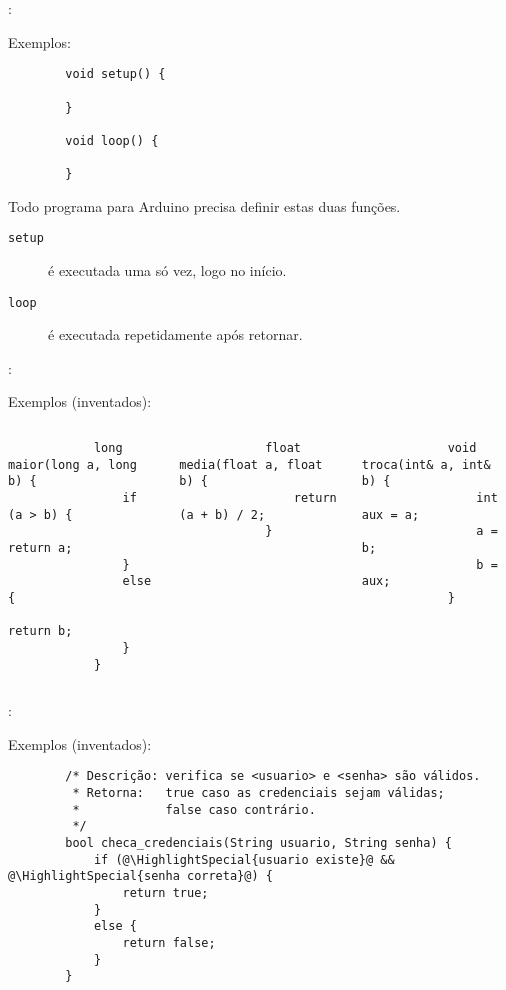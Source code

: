 \begin{frame}[fragile]{\insertsection: \insertsubsection}

	Exemplos:
	\begin{verbatim}
		void setup() {

		}

		void loop() {

		}
	\end{verbatim}

	Todo programa para Arduino precisa definir estas duas funções.
	\begin{description}
		\item[\texttt{setup}] é executada uma só vez, logo no início.
		\item[\texttt{loop}] é executada repetidamente após \texttt{} retornar.
	\end{description}

\end{frame}


\begin{frame}[fragile]{\insertsection: \insertsubsection}

	Exemplos (inventados):
	\begin{columns}[t]
		\begin{verbatim}
			long maior(long a, long b) {
				if (a > b) {
					return a;
				}
				else {
					return b;
				}
			}
		\end{verbatim}

		\begin{verbatim}
			float media(float a, float b) {
				return (a + b) / 2;
			}
		\end{verbatim}

		\vspace{-\medskipamount}
		\begin{verbatim}
			void troca(int& a, int& b) {
				int aux = a;
				a = b;
				b = aux;
			}
		\end{verbatim}
	\end{columns}

\end{frame}


\begin{frame}[fragile]{\insertsection: \insertsubsection}

	Exemplos (inventados):
	\begin{verbatim}
		/* Descrição: verifica se <usuario> e <senha> são válidos.
		 * Retorna:   true caso as credenciais sejam válidas;
		 *            false caso contrário.
		 */
		bool checa_credenciais(String usuario, String senha) {
			if (@\HighlightSpecial{usuario existe}@ && @\HighlightSpecial{senha correta}@) {
				return true;
			}
			else {
				return false;
			}
		}
	\end{verbatim}

\end{frame}


